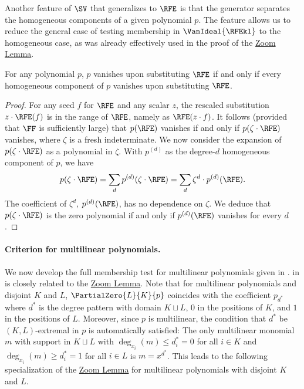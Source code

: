 Another feature of $\SV$ that generalizes to $\RFE$ is that the generator separates the homogeneous components of a given polynomial $p$. The feature allows us to reduce the general case of testing membership in $\VanIdeal{\RFEkl}$ to the homogeneous case, as was already effectively used in the proof of the \hyperref[lem.multi-zsub-deriv]{Zoom Lemma}.
\begin{proposition}
  \label{prop.rfe-homog}
  For any polynomial \(p\),
  \(p\) vanishes upon substituting \(\RFE\)
  if and only if 
  every homogeneous component of \(p\) vanishes upon substituting \(\RFE\).
\end{proposition}
\begin{proof}
  For any seed \(f\) for \(\RFE\)
  and any scalar \(z\),
  the rescaled substitution \(z \cdot \RFE(f)\)
  is in the range of \(\RFE\),
  namely as \(\RFE(z\cdot f)\).
  It follows (provided that \(\FF\) is sufficiently large)
  that \(p(\RFE)\) vanishes
  if and only if
  \(p(\zeta\cdot\RFE)\) vanishes,
  where \(\zeta\) is a fresh indeterminate.
  We now consider the expansion of \(p(\zeta\cdot\RFE)\)
  as a polynomial in \(\zeta\).
  With \(p^{(d)}\) as the degree-\(d\) homogeneous component of \(p\),
  we have
  \begin{equation*}
    p(\zeta \cdot \RFE)
      = \sum_d p^{(d)}(\zeta \cdot \RFE)
      = \sum_d \zeta^d \cdot p^{(d)}(\RFE).
  \end{equation*}
  The coefficient of \(\zeta^d\), \(p^{(d)}(\RFE)\),
  has no dependence on \(\zeta\).
  We deduce that
  \(p(\zeta\cdot\RFE)\) is the zero polynomial
  if and only if
  \(p^{(d)}(\RFE)\) vanishes for every \(d\).
\end{proof}

\paragraph{Criterion for multilinear polynomials.}

We now develop the full membership test for multilinear polynomials given in .  in  is closely related to the \hyperref[lem.multi-zsub-deriv]{Zoom Lemma}. Note that for multilinear polynomials and disjoint \(K\) and \(L\), \(\PartialZero{L}{K}{p}\) coincides with the coefficient \(p_{d^*}\) where \(d^*\) is the degree pattern with domain \(K \sqcup L\), \(0\) in the positions of \(K\), and \(1\) in the positions of \(L\).
Moreover, since \(p\) is multilinear,
the condition that \(d^*\) be \((K,L)\)-extremal in \(p\) is
automatically satisfied:
The only multilinear monomial \({m}\) with support in 
\(K\sqcup L\) with
\(\deg_{x_i}({m}) \le d^*_i = 0\) for all \(i\in K\)
and
\(\deg_{x_i}({m}) \ge d^*_i = 1\) for all \(i\in L\)
is \({m} = x^{d^*}\).
This leads to the following specialization of the \hyperref[lem.multi-zsub-deriv]{Zoom Lemma} for multilinear
polynomials with disjoint \(K\) and \(L\).

